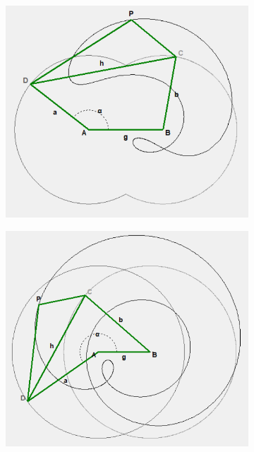 \documentclass{article}
\begin{document}
\begin{figure}[h]
\begin{subfigure}{0.19\textwidth}
		\caption{}
	\end{subfigure}
	\hfill
	\begin{subfigure}{0.19\textwidth}
		\centering
		\includegraphics[width=\linewidth, height=0.95\linewidth, keepaspectratio]{./Figures/27_motion_cases/1-11.png}
		\caption{}
	\end{subfigure}
	\hfill
	\begin{subfigure}{0.19\textwidth}
		\centering
		\includegraphics[width=\linewidth, height=0.95\linewidth, keepaspectratio]{./Figures/27_motion_cases/0-11.png}

\end{subfigure}
\end{figure}
\end{document}
